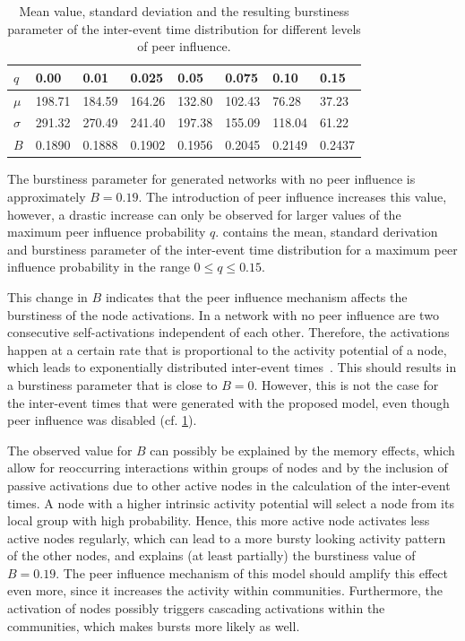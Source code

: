 \begin{table}
\centering
\begin{tabular}{llllllll}
\( q \) & 0.00 & 0.01 & 0.025 & 0.05 & 0.075 & 0.10 & 0.15 \\
\midrule
\( \mu \) & 198.71 & 184.59 & 164.26 & 132.80 & 102.43 & 76.28 & 37.23 \\
\midrule
\( \sigma \) & 291.32 & 270.49 & 241.40 & 197.38 & 155.09 & 118.04 & 61.22 \\
\midrule
\( B \) & 0.1890 & 0.1888 & 0.1902 & 0.1956 & 0.2045 & 0.2149 & 0.2437
\end{tabular}

\caption[Burstiness of inter-event time distributions]{Mean value, standard deviation and the resulting burstiness parameter of the inter-event time distribution for different levels of peer influence.}
\label{tbl:burstiness-parameter}
\end{table}


The burstiness parameter for generated networks with no peer influence is approximately \( B = 0.19 \).
The introduction of peer influence increases this value, however, a drastic increase can only be observed for larger values of the maximum peer influence probability \( q \).
 contains the mean, standard derivation and burstiness parameter of the inter-event time distribution for a maximum peer influence probability in the range \( 0 \leq q \leq 0.15 \).

This change in \( B \) indicates that the peer influence mechanism affects the burstiness of the node activations.
In a network with no peer influence are two consecutive self-activations independent of each other.
Therefore, the activations happen at a certain rate that is proportional to the activity potential of a node, which leads to exponentially distributed inter-event times~\cite{Moinet2016}.
This should results in a burstiness parameter that is close to \( B = 0 \).
However, this is not the case for the inter-event times that were generated with the proposed model, even though peer influence was disabled (cf. \cref{tbl:burstiness-parameter}).

The observed value for \( B \) can possibly be explained by the memory effects, which allow for reoccurring interactions within groups of nodes and by the inclusion of passive activations due to other active nodes in the calculation of the inter-event times.
A node with a higher intrinsic activity potential will select a node from its local group with high probability.
Hence, this more active node activates less active nodes regularly, which can lead to a more bursty looking activity pattern of the other nodes, and explains (at least partially) the burstiness value of \( B = 0.19 \).
The peer influence mechanism of this model should amplify this effect even more, since it increases the activity within communities.
Furthermore, the activation of nodes possibly triggers cascading activations within the communities, which makes bursts more likely as well.


